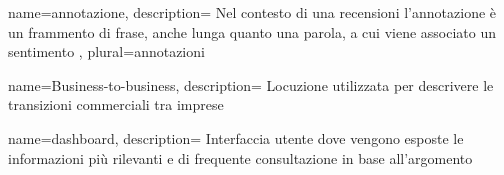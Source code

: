  {
name=annotazione,
description={
Nel contesto di una \gls{recensioni} l'annotazione è un frammento di frase,
anche lunga quanto una parola, a cui viene associato un sentimento
},
plural=annotazioni
}

 {
name=Business-to-business,
description={
Locuzione utilizzata per descrivere le transizioni commerciali tra imprese
}
}

 {
name=dashboard,
description={
Interfaccia utente dove vengono esposte le informazioni più rilevanti e di
frequente consultazione in base all'argomento
}
}

\makeglossaries


